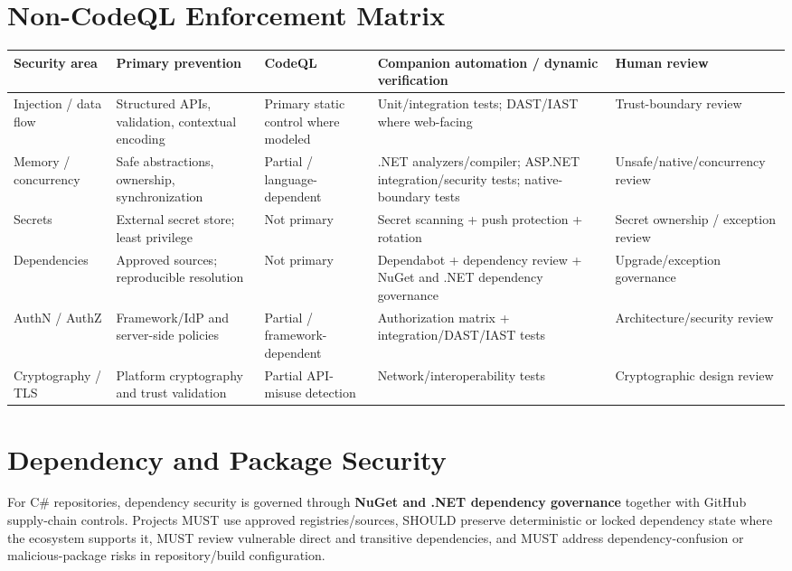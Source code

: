 \documentclass[10pt,letterpaper]{article}
\begin{document}
\section{Non-CodeQL Enforcement Matrix}
\begin{tabularx}{\textwidth}{@{}P{1.22in}Y P{1.55in} P{1.55in} P{1.5in}@{}}
\toprule
\textbf{Security area} & \textbf{Primary prevention} & \textbf{CodeQL} & \textbf{Companion automation / dynamic verification} & \textbf{Human review}\\
\midrule
Injection / data flow & Structured APIs, validation, contextual encoding & Primary static control where modeled & Unit/integration tests; DAST/IAST where web-facing & Trust-boundary review\\
Memory / concurrency & Safe abstractions, ownership, synchronization & Partial / language-dependent & .NET analyzers/compiler; ASP.NET integration/security tests; native-boundary tests & Unsafe/native/concurrency review\\
Secrets & External secret store; least privilege & Not primary & Secret scanning + push protection + rotation & Secret ownership / exception review\\
Dependencies & Approved sources; reproducible resolution & Not primary & Dependabot + dependency review + NuGet and .NET dependency governance & Upgrade/exception governance\\
AuthN / AuthZ & Framework/IdP and server-side policies & Partial / framework-dependent & Authorization matrix + integration/DAST/IAST tests & Architecture/security review\\
Cryptography / TLS & Platform cryptography and trust validation & Partial API-misuse detection & Network/interoperability tests & Cryptographic design review\\
\bottomrule
\end{tabularx}

\section{Dependency and Package Security}
For C\# repositories, dependency security is governed through \textbf{NuGet and .NET dependency governance} together with GitHub supply-chain controls. Projects MUST use approved registries/sources, SHOULD preserve deterministic or locked dependency state where the ecosystem supports it, MUST review vulnerable direct and transitive dependencies, and MUST address dependency-confusion or malicious-package risks in repository/build configuration.
\end{document}
